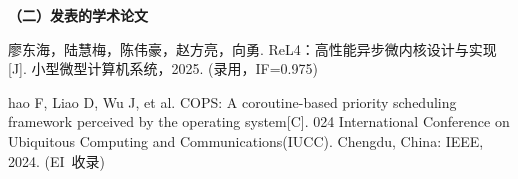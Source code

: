 
\begin{publications}{99}
 \noindent\textbf{（二）发表的学术论文}
 \begin{publist}
 \item  廖东海，陆慧梅，陈伟豪，赵方亮，向勇. ReL4：高性能异步微内核设计与实现[J]. 小型微型计算机系统，2025. (录用，IF=0.975)
 \item  hao F, Liao D, Wu J, et al. COPS: A coroutine-based priority scheduling framework perceived by the operating system[C]. 024 International Conference on Ubiquitous Computing and Communications(IUCC). Chengdu, China: IEEE, 2024. (EI~收录)
 \end{publist}

    
\end{publications}
